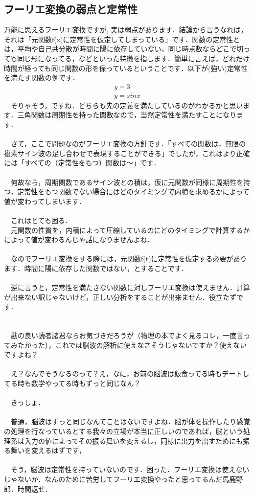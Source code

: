 \documentclass[11pt,a4paper,uplatex]{ujreport} 	%
\begin{document}
\subsection{フーリエ変換の弱点と定常性}
万能に思えるフーリエ変換ですが, 実は弱点があります．結論から言うなれば，それは「元関数f(x)に定常性を仮定してしまっている」です．関数の定常性とは，平均や自己共分散が時間に陽に依存していない，同じ時点数ならどこで切っても同じ形になってる，などといった特徴を指します．簡単に言えば，どれだけ時間が経っても同じ関数の形を保っているということです．以下が(強い)定常性を満たす関数の例です．
\begin{eqnarray}
y = 3\\
y = sinx
\end{eqnarray}
　そりゃそう，ですね．どちらも先の定義を満たしているのがわかるかと思います．三角関数は周期性を持った関数なので，当然定常性を満たすことになります．\\ \\
　さて，ここで問題なのがフーリエ変換の方針です．「すべての関数は，無限の複素サイン波の足し合わせで表現することができる」でしたが，これはより正確には「すべての（定常性をもつ）関数は〜」です．\\ \\
　何故なら，周期関数であるサイン波との積は，仮に元関数が同様に周期性を持つ，定常性をもつ関数でない場合にはどのタイミングで内積を求めるかによって値が変わってしまいます．\\
\\ 
　これはとても困る．\\
　元関数の性質を，内積によって圧縮しているのにどのタイミングで計算するかによって値が変わるんじゃ話になりませんよね．\\
\\
　なのでフーリエ変換をする際には，元関数f(t)に定常性を仮定する必要があります．時間に陽に依存した関数ではない，とすることです．\\
\\
　逆に言うと，定常性を満たさない関数に対しフーリエ変換は使えません．計算が出来ない訳じゃないけど，正しい分析をすることが出来ません．役立たずです．\\
\\
\\
　勘の良い読者諸君ならお気づきだろうが（物理の本でよく見るコレ，一度言ってみたかった），これでは脳波の解析に使えなさそうじゃないですか？使えないですよね？\\
\\
　え？なんでそうなるのって？え，なに，お前の脳波は飯食ってる時もデートしてる時も数学やってる時もずっと同じなん？\\ \\
　きっしょ．\\
\\
　普通，脳波はずっと同じなんてことはないですよね．脳が体を操作したり感覚の処理を行なっているとする我々の立場が本当に正しいのであれば，脳という処理系は入力の値によってその振る舞いを変えるし，同様に出力を出すためにも振る舞いを変えるはずです，\\
\\
　そう，脳波は定常性を持っていないのです．困った．フーリエ変換は使えないじゃないか．なんのために苦労してフーリエ変換やったと思ってるんだ馬鹿野郎．時間返せ．\\
\\
\end{document}

